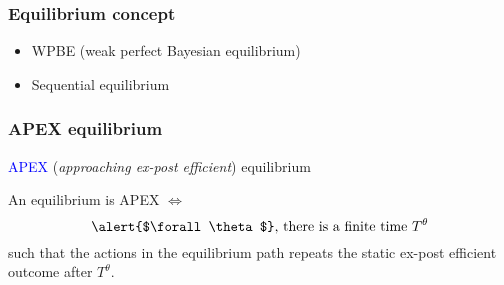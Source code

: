\documentclass[8pt]{beamer}
\begin{document}
\begin{frame}
  \frametitle{Equilibrium concept}

\begin{itemize}
\item WPBE (weak perfect Bayesian equilibrium)
\item Sequential equilibrium
\end{itemize}
\end{frame}


\begin{frame}
  \frametitle{APEX equilibrium}

\textcolor{blue}{APEX} (\textit{approaching ex-post efficient}) equilibrium

\begin{definition}
An equilibrium is APEX $\Leftrightarrow$ 
\[\text{\alert{$\forall\theta$},  there is a finite time $T^{\theta}$}\] 
such that the actions in the equilibrium path repeats the static ex-post efficient outcome after $T^{\theta}$. 
\end{definition}

\end{frame}
\end{document}
